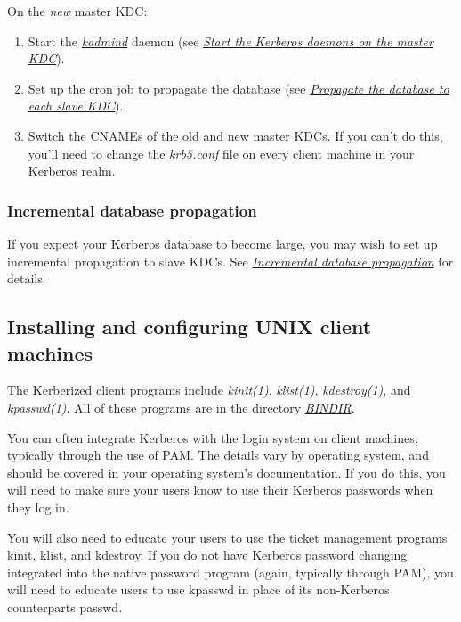 \documentclass[letterpaper,10pt,english]{sphinxmanual}
\begin{document}
On the \emph{new} master KDC:
\begin{enumerate}
\item {} 
Start the {\hyperref[admin/admin_commands/kadmind:kadmind-8]{\emph{kadmind}}} daemon (see {\hyperref[admin/install_kdc:start-kdc-daemons]{\emph{Start the Kerberos daemons on the master KDC}}}).

\item {} 
Set up the cron job to propagate the database (see
{\hyperref[admin/install_kdc:kprop-to-slaves]{\emph{Propagate the database to each slave KDC}}}).

\item {} 
Switch the CNAMEs of the old and new master KDCs.  If you can't do
this, you'll need to change the {\hyperref[admin/conf_files/krb5_conf:krb5-conf-5]{\emph{krb5.conf}}} file on every
client machine in your Kerberos realm.

\end{enumerate}


\subsubsection{Incremental database propagation}
\label{admin/install_kdc:incremental-database-propagation}
If you expect your Kerberos database to become large, you may wish to
set up incremental propagation to slave KDCs.  See {\hyperref[admin/database:incr-db-prop]{\emph{Incremental database propagation}}}
for details.


\subsection{Installing and configuring UNIX client machines}
\label{admin/install_clients:installing-and-configuring-unix-client-machines}\label{admin/install_clients::doc}
The Kerberized client programs include \emph{kinit(1)},
\emph{klist(1)}, \emph{kdestroy(1)}, and \emph{kpasswd(1)}.  All of
these programs are in the directory {\hyperref[mitK5defaults:paths]{\emph{BINDIR}}}.

You can often integrate Kerberos with the login system on client
machines, typically through the use of PAM.  The details vary by
operating system, and should be covered in your operating system's
documentation.  If you do this, you will need to make sure your users
know to use their Kerberos passwords when they log in.

You will also need to educate your users to use the ticket management
programs kinit, klist, and kdestroy.  If you do not have Kerberos
password changing integrated into the native password program (again,
typically through PAM), you will need to educate users to use kpasswd
in place of its non-Kerberos counterparts passwd.
\end{document}
